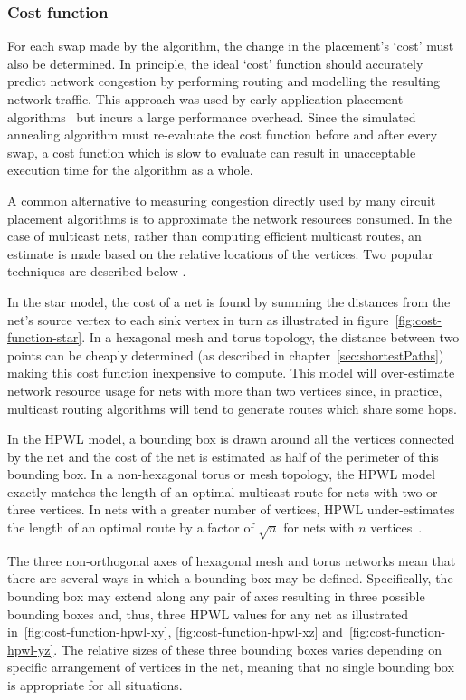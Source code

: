 			\subsubsection{Cost function}
				
				For each swap made by the algorithm, the change in the placement's
				`cost' must also be determined. In principle, the ideal `cost' function
				should accurately predict network congestion by performing routing and
				modelling the resulting network traffic. This approach was used by
				early application placement algorithms~\cite{steele85} but incurs a
				large performance overhead. Since the simulated annealing algorithm
				must re-evaluate the cost function before and after every swap, a cost
				function which is slow to evaluate can result in unacceptable execution
				time for the algorithm as a whole.
				
				A common alternative to measuring congestion directly used by many
				circuit placement algorithms is to approximate the network resources
				consumed. In the case of multicast nets, rather than computing
				efficient multicast routes, an estimate is made based on the relative
				locations of the vertices. Two popular techniques are described below
				\cite[\S4.2]{kahng11}.
				
				In the star model, the cost of a net is found by summing the distances
				from the net's source vertex to each sink vertex in turn as illustrated
				in figure~\ref{fig:cost-function-star}. In a hexagonal mesh and torus
				topology, the distance between two points can be cheaply determined (as
				described in chapter~\ref{sec:shortestPaths}) making this cost function
				inexpensive to compute. This model will over-estimate network resource
				usage for nets with more than two vertices since, in practice,
				multicast routing algorithms will tend to generate routes which share
				some hops.
				
				In the HPWL model, a bounding box is drawn around all the vertices
				connected by the net and the cost of the net is estimated as half of
				the perimeter of this bounding box. In a non-hexagonal torus or mesh
				topology, the HPWL model exactly matches the length of an optimal
				multicast route for nets with two or three vertices. In nets with a
				greater number of vertices, HPWL under-estimates the length of an
				optimal route by a factor of $\sqrt{n}$ for nets with $n$
				vertices~\cite{chung79}.
				
				The three non-orthogonal axes of hexagonal mesh and torus networks mean
				that there are several ways in which a bounding box may be defined.
				Specifically, the bounding box may extend along any pair of axes
				resulting in three possible bounding boxes and, thus, three HPWL values
				for any net as illustrated in~\ref{fig:cost-function-hpwl-xy},
				\ref{fig:cost-function-hpwl-xz} and~\ref{fig:cost-function-hpwl-yz}.
				The relative sizes of these three bounding boxes varies depending on
				specific arrangement of vertices in the net, meaning that no single
				bounding box is appropriate for all situations.
				
